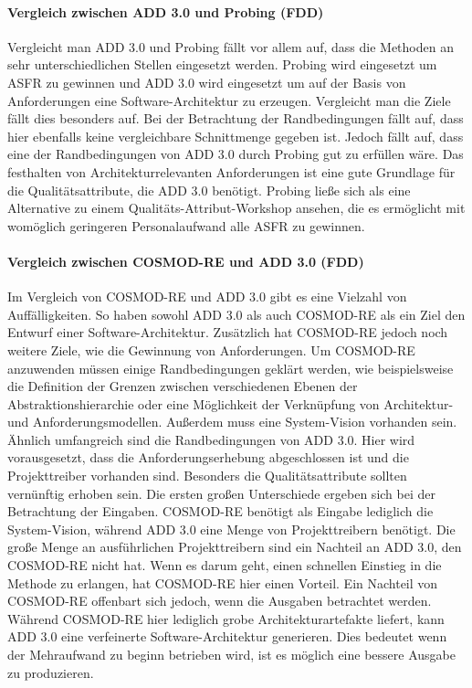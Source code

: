 \paragraph{Vergleich zwischen ADD 3.0 und Probing (FDD)}
Vergleicht man ADD 3.0 und Probing fällt vor allem auf, dass die Methoden an sehr unterschiedlichen Stellen eingesetzt werden. Probing wird eingesetzt um ASFR zu gewinnen und ADD 3.0 wird eingesetzt um auf der Basis von Anforderungen eine Software-Architektur zu erzeugen. Vergleicht man die Ziele fällt dies besonders auf. Bei der Betrachtung der Randbedingungen fällt auf, dass hier ebenfalls keine vergleichbare Schnittmenge gegeben ist. Jedoch fällt auf, dass eine der Randbedingungen von ADD 3.0 durch Probing gut zu erfüllen wäre. Das festhalten von Architekturrelevanten Anforderungen ist eine gute Grundlage für die Qualitätsattribute, die ADD 3.0 benötigt. Probing ließe sich als eine Alternative zu einem Qualitäts-Attribut-Workshop ansehen, die es ermöglicht mit womöglich geringeren Personalaufwand alle ASFR zu gewinnen. \\

\paragraph{Vergleich zwischen COSMOD-RE und ADD 3.0 (FDD)}
Im Vergleich von COSMOD-RE und ADD 3.0 gibt es eine Vielzahl von Auffälligkeiten. So haben sowohl ADD 3.0 als auch COSMOD-RE als ein Ziel den Entwurf einer Software-Architektur. Zusätzlich hat COSMOD-RE jedoch noch weitere Ziele, wie die Gewinnung von Anforderungen. Um COSMOD-RE anzuwenden müssen einige Randbedingungen geklärt werden, wie beispielsweise die Definition der Grenzen zwischen verschiedenen Ebenen der Abstraktionshierarchie oder eine Möglichkeit der Verknüpfung von Architektur- und Anforderungsmodellen. Außerdem muss eine System-Vision vorhanden sein. Ähnlich umfangreich sind die Randbedingungen von ADD 3.0. Hier wird vorausgesetzt, dass die Anforderungserhebung abgeschlossen ist und die Projekttreiber vorhanden sind. Besonders die Qualitätsattribute sollten vernünftig erhoben sein. Die ersten großen Unterschiede ergeben sich bei der Betrachtung der Eingaben. COSMOD-RE benötigt als Eingabe lediglich die System-Vision, während ADD 3.0 eine Menge von Projekttreibern benötigt. Die große Menge an ausführlichen Projekttreibern sind ein Nachteil an ADD 3.0, den COSMOD-RE nicht hat. Wenn es darum geht, einen schnellen Einstieg in die Methode zu erlangen, hat COSMOD-RE hier einen Vorteil. Ein Nachteil von COSMOD-RE offenbart sich jedoch, wenn die Ausgaben betrachtet werden. Während COSMOD-RE hier lediglich grobe Architekturartefakte liefert, kann ADD 3.0 eine verfeinerte Software-Architektur generieren. Dies bedeutet wenn der Mehraufwand zu beginn betrieben wird, ist es möglich eine bessere Ausgabe zu produzieren. \\

